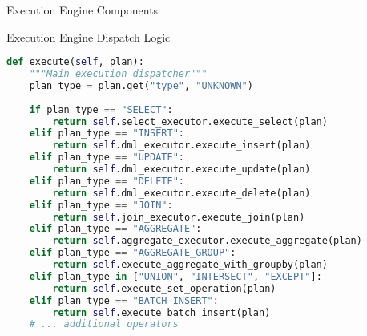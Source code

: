 \documentclass[aspectratio=169]{beamer}
\begin{document}
\begin{frame}{Execution Engine Components}
\begin{center}
\end{center}
\end{frame}

\begin{frame}[fragile]{Execution Engine Dispatch Logic}
\begin{lstlisting}[language=Python]
def execute(self, plan):
    """Main execution dispatcher"""
    plan_type = plan.get("type", "UNKNOWN")
    
    if plan_type == "SELECT":
        return self.select_executor.execute_select(plan)
    elif plan_type == "INSERT":
        return self.dml_executor.execute_insert(plan)
    elif plan_type == "UPDATE":
        return self.dml_executor.execute_update(plan)
    elif plan_type == "DELETE":
        return self.dml_executor.execute_delete(plan)
    elif plan_type == "JOIN":
        return self.join_executor.execute_join(plan)
    elif plan_type == "AGGREGATE":
        return self.aggregate_executor.execute_aggregate(plan)
    elif plan_type == "AGGREGATE_GROUP":
        return self.execute_aggregate_with_groupby(plan)
    elif plan_type in ["UNION", "INTERSECT", "EXCEPT"]:
        return self.execute_set_operation(plan)
    elif plan_type == "BATCH_INSERT":
        return self.execute_batch_insert(plan)
    # ... additional operators
\end{lstlisting}
\end{frame}
\end{document}
